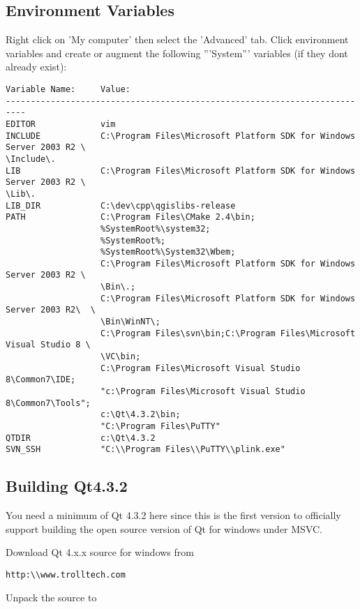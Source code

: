 \subsection{Environment Variables}
Right click on 'My computer' then select the 'Advanced' tab. Click environment variables and 
create or augment the following '''System''' variables (if they dont already exist):

\begin{verbatim}
Variable Name:     Value:
--------------------------------------------------------------------------
EDITOR             vim
INCLUDE            C:\Program Files\Microsoft Platform SDK for Windows Server 2003 R2 \
\Include\.
LIB                C:\Program Files\Microsoft Platform SDK for Windows Server 2003 R2 \
\Lib\.
LIB_DIR            C:\dev\cpp\qgislibs-release
PATH               C:\Program Files\CMake 2.4\bin;
                   %SystemRoot%\system32;
                   %SystemRoot%;
                   %SystemRoot%\System32\Wbem;
                   C:\Program Files\Microsoft Platform SDK for Windows Server 2003 R2 \
                   \Bin\.;
                   C:\Program Files\Microsoft Platform SDK for Windows Server 2003 R2\  \
                   \Bin\WinNT\;
                   C:\Program Files\svn\bin;C:\Program Files\Microsoft Visual Studio 8 \
                   \VC\bin;
                   C:\Program Files\Microsoft Visual Studio 8\Common7\IDE;
                   "c:\Program Files\Microsoft Visual Studio 8\Common7\Tools";
                   c:\Qt\4.3.2\bin;
                   "C:\Program Files\PuTTY"
QTDIR              c:\Qt\4.3.2
SVN_SSH            "C:\\Program Files\\PuTTY\\plink.exe"
\end{verbatim}

\subsection{Building Qt4.3.2}
You need a minimum of Qt 4.3.2 here since this is the first version to officially 
support building the open source version of Qt for windows under MSVC.

Download Qt 4.x.x source for windows from

\begin{verbatim}
http:\\www.trolltech.com
\end{verbatim}

Unpack the source to 

